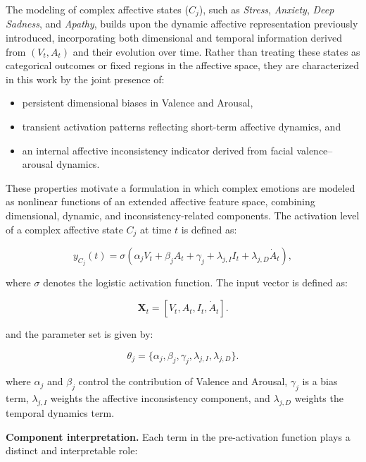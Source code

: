 \documentclass[letterpaper, 10 pt, conference]{ieeeconf}  %
\begin{document}
The modeling of complex affective states ($C_j$), such as \emph{Stress}, \emph{Anxiety}, \emph{Deep Sadness}, and \emph{Apathy}, builds upon the dynamic affective representation previously introduced, incorporating both dimensional and temporal information derived from $(V_t, A_t)$ and their evolution over time. Rather than treating these states as categorical outcomes or fixed regions in the affective space, they are characterized in this work by the joint presence of:

\begin{itemize}
\item persistent dimensional biases in Valence and Arousal,
\item transient activation patterns reflecting short-term affective dynamics, and
\item an internal affective inconsistency indicator derived from facial valence--arousal dynamics.
\end{itemize}

These properties motivate a formulation in which complex emotions are modeled as nonlinear functions of an extended affective feature space, combining dimensional, dynamic, and inconsistency-related components. The activation level of a complex affective state $C_j$ at time $t$ is defined as:

\begin{equation}
y_{C_j}(t) = \sigma\!\left(
\alpha_j V_t + 
\beta_j A_t +
\gamma_j +
\lambda_{j,I} I_t +
\lambda_{j,D} \dot{A}_t
\right),
\end{equation}

where $\sigma$ denotes the logistic activation function. The input vector is defined as:

\begin{equation}
\mathbf{X}_t = [V_t, A_t, I_t, \dot{A}_t].
\end{equation}

and the parameter set is given by:

\begin{equation}
\theta_j = \{\alpha_j, \beta_j, \gamma_j, \lambda_{j,I}, \lambda_{j,D}\}.
\end{equation}

where $\alpha_j$ and $\beta_j$ control the contribution of Valence and Arousal, $\gamma_j$ is a bias term, $\lambda_{j,I}$ weights the affective inconsistency component, and $\lambda_{j,D}$ weights the temporal dynamics term.

\vspace{0.3em}
\noindent
\textbf{Component interpretation.}
Each term in the pre-activation function plays a distinct and interpretable role:
\end{document}
